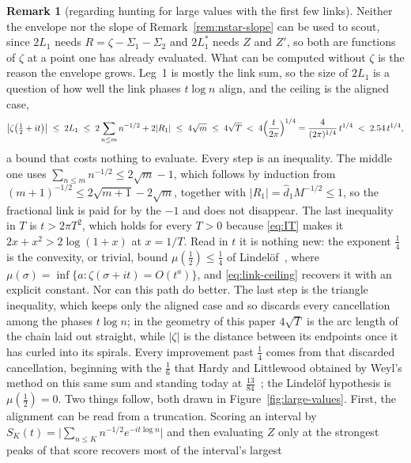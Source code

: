 \documentclass[11pt]{article}
\theoremstyle{definition}
\newtheorem{remark}[theorem]{Remark}
\begin{document}
\begin{remark}[regarding hunting for large values with the first few links]
\label{rem:large-values}
Neither the envelope nor the slope of Remark~\ref{rem:nstar-slope} can be used to
scout, since $2L_1$ needs $R=\zeta-\Sigma_1-\Sigma_2$ and $2L_1^{\ast}$ needs $Z$
and $Z'$, so both are functions of $\zeta$ at a point one has already evaluated.
What can be computed without $\zeta$ is the reason the envelope grows. Leg~1 is
mostly the link sum, so
the size of $2L_1$ is a question of how well the link phases $t\log n$ align, and
the ceiling is the aligned case,
\begin{equation}\label{eq:link-ceiling}
\bigl|\zeta\bigl(\tfrac12+it\bigr)\bigr|\;\leq\;2L_1\;\leq\;
2\sum_{n\leq m}n^{-1/2}+2|R_{1}|\;\leq\;4\sqrt{m}\;\leq\;4\sqrt{T}
\;<\;4\Bigl(\frac{t}{2\pi}\Bigr)^{1/4}
=\frac{4}{(2\pi)^{1/4}}\,t^{1/4}\;<\;2.54\,t^{1/4},
\end{equation}
a bound that costs nothing to evaluate. Every step is an inequality. The
middle one uses $\sum_{n\leq m}n^{-1/2}\leq2\sqrt m-1$, which follows by
induction from $(m+1)^{-1/2}\leq2\sqrt{m+1}-2\sqrt m$, together with
$|R_1|=\hat d_1M^{-1/2}\leq1$, so the fractional link is paid for by the $-1$
and does not disappear. The last inequality in $T$ is $t>2\pi T^2$, which holds
for every $T>0$ because \eqref{eq:IT} makes it $2x+x^2>2\log(1+x)$ at
$x=1/T$. Read in $t$ it is nothing new: the
exponent $\tfrac14$ is the convexity, or trivial, bound $\mu(\tfrac12)\le\tfrac14$
of Lindel\"of~\cite{Lindelof1908}, where
$\mu(\sigma)=\inf\{a:\zeta(\sigma+it)=O(t^{a})\}$,
and \eqref{eq:link-ceiling} recovers it with an
explicit constant. Nor can this path do better. The last step is the triangle
inequality, which keeps only the aligned case and so discards every cancellation
among the phases $t\log n$; in the geometry of this paper $4\sqrt T$ is the arc
length of the chain laid out straight, while $|\zeta|$ is the distance between its
endpoints once it has curled into its spirals. Every improvement past $\tfrac14$
comes from that discarded cancellation, beginning with the $\tfrac16$ that Hardy
and Littlewood obtained by Weyl's method on this same sum and standing today at
$\tfrac{13}{84}$~\cite{Bourgain2017}; the Lindel\"of hypothesis is
$\mu(\tfrac12)=0$. Two things follow, both drawn in
Figure~\ref{fig:large-values}. First, the alignment can be read from a
truncation. Scoring an interval by
$S_K(t)=\bigl|\sum_{n\leq K}n^{-1/2}e^{-it\log n}\bigr|$ and then evaluating $Z$
only at the strongest peaks of that score recovers most of the interval's largest

\end{remark}
\end{document}
